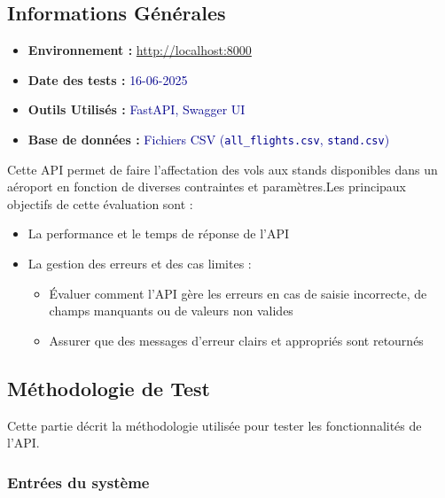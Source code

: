 \subsection*{Informations Générales}
\begin{itemize}
	\item \textbf{Environnement :} \url{http://localhost:8000}
	\item \textbf{Date des tests :} \textcolor{darkblue}{16-06-2025}
	\item \textbf{Outils Utilisés :} \textcolor{darkblue}{FastAPI, Swagger UI}
	\item \textbf{Base de données :}\textcolor{darkblue}{ Fichiers CSV (\texttt{all\_flights.csv}, \texttt{stand.csv})}
	
\end{itemize}
\vspace{0.15cm}
Cette API permet de faire l'affectation des vols aux stands disponibles dans un aéroport en fonction de diverses contraintes et paramètres.Les principaux objectifs de cette évaluation sont :
\begin{itemize}
	\item La performance et le temps de réponse de l'API
	\item La gestion des erreurs et des cas limites :
	\begin{itemize}
		\item Évaluer comment l'API gère les erreurs en cas de saisie incorrecte, de champs manquants ou de valeurs non valides
		\item Assurer que des messages d'erreur clairs et appropriés sont retournés
	\end{itemize}
\end{itemize}

\vspace{-1.3em}
\subsection*{Méthodologie de Test}
Cette partie décrit la méthodologie utilisée pour tester les fonctionnalités de l’API.
\vspace{-1em}
\subsubsection{Entrées du système}

\vspace{0.15cm}

